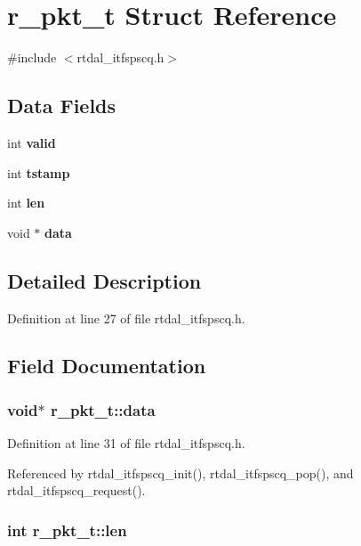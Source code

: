 \section{r\-\_\-pkt\-\_\-t Struct Reference}
\label{structr__pkt__t}


{\ttfamily \#include $<$rtdal\-\_\-itfspscq.\-h$>$}

\subsection*{Data Fields}
\begin{DoxyCompactItemize}
\item 
int {\bf valid}
\item 
int {\bf tstamp}
\item 
int {\bf len}
\item 
void $\ast$ {\bf data}
\end{DoxyCompactItemize}


\subsection{Detailed Description}


Definition at line 27 of file rtdal\-\_\-itfspscq.\-h.



\subsection{Field Documentation}
\subsubsection[{data}]{\setlength{\rightskip}{0pt plus 5cm}void$\ast$ r\-\_\-pkt\-\_\-t\-::data}\label{structr__pkt__t_a031b8fabbf383a6ab7ddef2b424918a7}


Definition at line 31 of file rtdal\-\_\-itfspscq.\-h.



Referenced by rtdal\-\_\-itfspscq\-\_\-init(), rtdal\-\_\-itfspscq\-\_\-pop(), and rtdal\-\_\-itfspscq\-\_\-request().

\subsubsection[{len}]{\setlength{\rightskip}{0pt plus 5cm}int r\-\_\-pkt\-\_\-t\-::len}\label{structr__pkt__t_a9c23f94deac4bfb5f8584afcdd107f8a}


